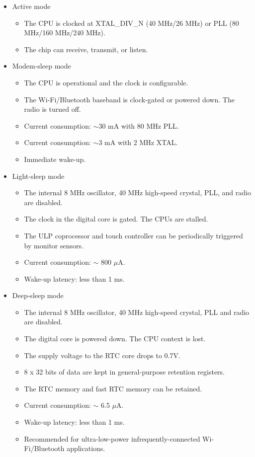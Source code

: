 \documentclass[main\_\_EN.tex]{subfiles}
\begin{document}
\begin{itemize}
    \item Active mode
    \begin{itemize}
        \item The CPU is clocked at XTAL\_DIV\_N (40 MHz/26 MHz) or PLL (80 MHz/160 MHz/240 MHz).
        \item The chip can receive, transmit, or listen.
    \end{itemize}

    \item Modem-sleep mode
    \begin{itemize}
        \item The CPU is operational and the clock is configurable.
        \item The Wi-Fi/Bluetooth baseband is clock-gated or powered down. The radio is turned off.
        \item Current consumption: $\sim$30 mA with 80 MHz PLL.
        \item Current consumption: $\sim$3 mA with 2 MHz XTAL.
        \item Immediate wake-up.
    \end{itemize}

    \item Light-sleep mode
    \begin{itemize}
        \item The internal 8 MHz oscillator, 40 MHz high-speed crystal, PLL, and radio are disabled.
        \item The clock in the digital core is gated. The CPUs are stalled.
        \item The ULP coprocessor and touch controller can be periodically triggered by monitor sensors.
        \item Current consumption: $\sim$ 800 $\mu$A.
        \item Wake-up latency: less than 1 ms.
    \end{itemize}

    \item Deep-sleep mode
    \begin{itemize}
        \item The internal 8 MHz oscillator, 40 MHz high-speed crystal, PLL and radio are disabled.
        \item The digital core is powered down. The CPU context is lost.
        \item The supply voltage to the RTC core drops to 0.7V.
        \item 8 x 32 bits of data are kept in general-purpose retention registers.
        \item The RTC memory and fast RTC memory can be retained.
        \item Current consumption: $\sim$ 6.5 $\mu$A.
        \item Wake-up latency: less than 1 ms.
        \item Recommended for ultra-low-power infrequently-connected Wi-Fi/Bluetooth applications.
    \end{itemize}


\end{itemize}
\end{document}
